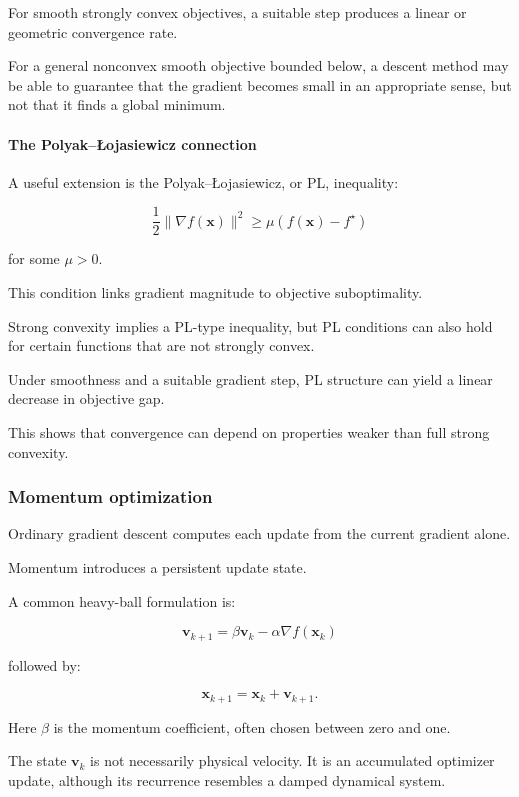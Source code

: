 For smooth strongly convex objectives, a suitable step produces a linear or geometric convergence rate.

For a general nonconvex smooth objective bounded below, a descent method may be able to guarantee that the gradient becomes small in an appropriate sense, but not that it finds a global minimum.

\paragraph{The Polyak--Łojasiewicz connection}\label{02-foundations-ii-ch026-the-polyakux142ojasiewicz-connection}

A useful extension is the Polyak--Łojasiewicz, or PL, inequality:

\[
\frac12\|\nabla f(\mathbf x)\|^2 \ge \mu(f(\mathbf x)-f^\star)
\]

for some \(\mu>0\).

This condition links gradient magnitude to objective suboptimality.

Strong convexity implies a PL-type inequality, but PL conditions can also hold for certain functions that are not strongly convex.

Under smoothness and a suitable gradient step, PL structure can yield a linear decrease in objective gap.

This shows that convergence can depend on properties weaker than full strong convexity.

\subsubsection{Momentum optimization}\label{02-foundations-ii-ch026-momentum-optimization}

Ordinary gradient descent computes each update from the current gradient alone.

Momentum introduces a persistent update state.

A common heavy-ball formulation is:

\[
\boxed{ \mathbf v_{k+1} = \beta\mathbf v_k-\alpha\nabla f(\mathbf x_k) }
\]

followed by:

\[
\boxed{ \mathbf x_{k+1}=\mathbf x_k+\mathbf v_{k+1} }.
\]

Here \(\beta\) is the momentum coefficient, often chosen between zero and one.

The state \(\mathbf v_k\) is not necessarily physical velocity. It is an accumulated optimizer update, although its recurrence resembles a damped dynamical system.

